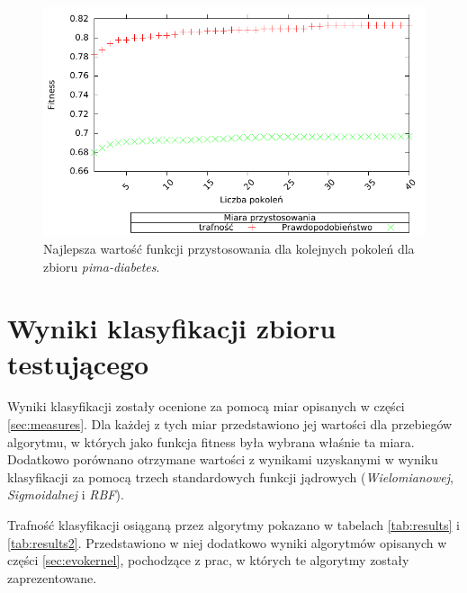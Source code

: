         \begin{figure}
                \includegraphics[scale=0.90]{figures/results/fitness/fitness-pima-diabetes}
                \caption{Najlepsza wartość funkcji przystosowania dla kolejnych pokoleń dla zbioru \emph{pima-diabetes}.\label{fig:fit-pima-diabetes}}
        \end{figure}    

	
\FloatBarrier
\section{Wyniki klasyfikacji zbioru testującego}
	Wyniki klasyfikacji zostały ocenione za pomocą miar opisanych w części \ref{sec:measures}. Dla każdej z tych miar przedstawiono jej wartości dla przebiegów algorytmu, w których jako funkcja fitness była wybrana właśnie ta miara. Dodatkowo porównano otrzymane wartości z wynikami uzyskanymi w wyniku klasyfikacji za pomocą trzech standardowych funkcji jądrowych (\emph{Wielomianowej}, \emph{Sigmoidalnej} i \emph{RBF}).
	
	Trafność klasyfikacji osiąganą przez algorytmy pokazano w tabelach \ref{tab:results} i \ref{tab:results2}. Przedstawiono w niej dodatkowo wyniki algorytmów opisanych w części \ref{sec:evokernel}, pochodzące z prac, w których te algorytmy zostały zaprezentowane.
	
